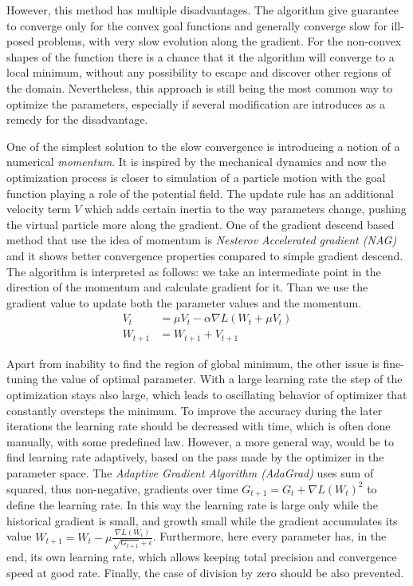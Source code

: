 However, this method has multiple disadvantages.
The algorithm give guarantee to converge only for the convex goal functions and generally converge slow for ill-posed problems, with very slow evolution along the gradient.
For the non-convex shapes of the function there is a chance that it the algorithm will converge to a local minimum, without any possibility to escape and discover other regions of the domain.
Nevertheless, this approach is still being the most common way to optimize the parameters, especially if several modification are introduces as a remedy for the disadvantage.

One of the simplest solution to the slow convergence is introducing a notion of a numerical \textit{momentum}.
It is inspired by the mechanical dynamics and now the optimization process is closer to simulation of a particle motion with the goal function playing a role of the potential field.
The update rule has an additional velocity term $V$ which adds certain inertia to the way parameters change, pushing the virtual particle more along the gradient. 
One of the gradient descend based method that use the idea of momentum is \textit{Nesterov Accelerated gradient (NAG)} and it shows better convergence properties compared to simple gradient descend.
The algorithm is interpreted as follows: 
we take an intermediate point in the direction of the momentum and calculate gradient for it.
Than we use the gradient value to update both the parameter values and the momentum.
\begin{align*}
	V_{t} & =\mu V_{t} - \alpha \nabla L (W_{t}+\mu V_{t}) \\
	W_{t+1} & = W_{t+1} + V_{t+1}
\end{align*}

Apart from inability to find the region of global minimum, the other issue is fine-tuning the value of optimal parameter.
With a large learning rate the step of the optimization stays also large, which leads to oscillating behavior of optimizer that constantly oversteps the minimum.
To improve the accuracy during the later iterations the learning rate should be decreased with time, which is often done manually, with some predefined law. 
However, a more general way, would be to find learning rate adaptively, based on the pass made by the optimizer in the parameter space.
The \textit{Adaptive Gradient Algorithm (AdaGrad)} uses sum of squared, thus non-negative, gradients over time $G_{t+1} = G_{t}+\nabla L(W_{t})^2$ to define the learning rate.
In this way the learning rate is large only while the historical gradient is small, and growth small while the gradient accumulates its value $ W_{t+1} = W_{t} -\mu \frac{\nabla L(W_{t})}{\sqrt{G_{t+1}}+\epsilon} $.
Furthermore, here every parameter has, in the end, its own learning rate, which allows keeping total precision and convergence speed at good rate.
Finally, the case of division by zero should be also prevented. 

